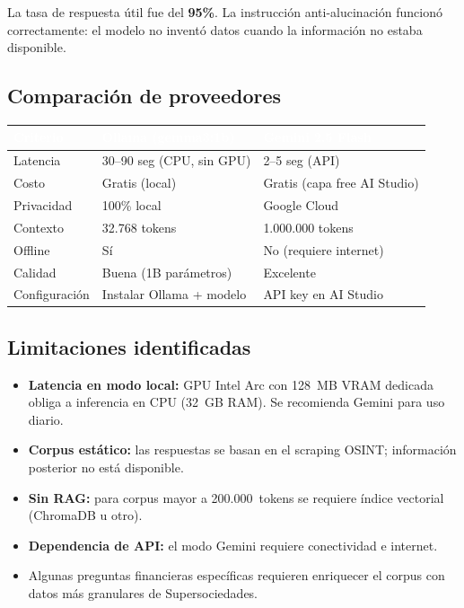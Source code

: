 \documentclass[12pt, a4paper]{article}
\newcommand{\THead}[1]{\cellcolor{hbg}\textcolor{white}{\sffamily\bfseries\small #1}}
\newcommand{\TA}{\rowcolor{g4}}
\begin{document}
\vspace{6pt}

La tasa de respuesta útil fue del \textbf{95\%}. La instrucción anti-alucinación
funcionó correctamente: el modelo no inventó datos cuando la información no estaba
disponible.

\subsection{Comparación de proveedores}

\begin{tabularx}{\linewidth}{F{4.2cm} L L}
\toprule
\THead{Criterio} & \THead{Ollama (gemma3:1b)} & \THead{Gemini 2.5 Flash} \\
\midrule
Latencia         & 30--90 seg (CPU, sin GPU) & 2--5 seg (API) \\
\TA Costo        & Gratis (local)            & Gratis (capa free AI Studio) \\
Privacidad       & 100\% local               & Google Cloud \\
\TA Contexto     & 32.768 tokens             & 1.000.000 tokens \\
Offline          & Sí                        & No (requiere internet) \\
\TA Calidad      & Buena (1B parámetros)     & Excelente \\
Configuración    & Instalar Ollama + modelo  & API key en AI Studio \\
\bottomrule
\end{tabularx}

\vspace{6pt}

\subsection{Limitaciones identificadas}

\begin{itemize}
  \item \textbf{Latencia en modo local:} GPU Intel Arc con 128~MB VRAM dedicada obliga
        a inferencia en CPU (32~GB RAM). Se recomienda Gemini para uso diario.
  \item \textbf{Corpus estático:} las respuestas se basan en el scraping OSINT; información
        posterior no está disponible.
  \item \textbf{Sin RAG:} para corpus mayor a 200.000~tokens se requiere índice vectorial
        (ChromaDB u otro).
  \item \textbf{Dependencia de API:} el modo Gemini requiere conectividad e internet.
  \item Algunas preguntas financieras específicas requieren enriquecer el corpus con
        datos más granulares de Supersociedades.
\end{itemize}
\end{document}
